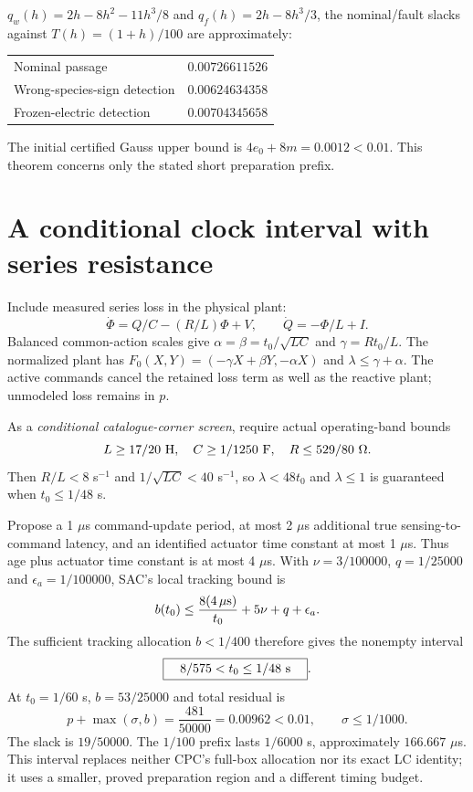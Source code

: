 \documentclass[10pt,a4paper]{article}
\begin{document}
$q_w(h)=2h-8h^2-11h^3/8$ and $q_f(h)=2h-8h^3/3$, the nominal/fault slacks against $T(h)=(1+h)/100$ are approximately:
\begin{center}
\begin{tabular}{lr}\toprule
Nominal passage & $0.00726611526$\\
Wrong-species-sign detection & $0.00624634358$\\
Frozen-electric detection & $0.00704345658$\\\bottomrule
\end{tabular}
\end{center}
The initial certified Gauss upper bound is $4e_0+8m=0.0012<0.01$. This theorem concerns only the stated short preparation prefix.
\newpage
\section{A conditional clock interval with series resistance}
Include measured series loss in the physical plant:
\begin{equation}
\dot\Phi=Q/C-(R/L)\Phi+V,\qquad \dot Q=-\Phi/L+I .
\end{equation}
Balanced common-action scales give $\alpha=\beta=t_0/\sqrt{LC}$ and $\gamma=Rt_0/L$. The normalized plant has
$F_0(X,Y)=(-\gamma X+\beta Y,-\alpha X)$ and
$\lambda\leq\gamma+\alpha$.
The active commands cancel the retained loss term as well as the reactive plant; unmodeled loss remains in $p$.

As a \emph{conditional catalogue-corner screen}, require actual operating-band bounds
\begin{equation}
L\geq17/20\ {\rm H},\quad C\geq1/1250\ {\rm F},\quad
R\leq529/80\ \Omega .
\end{equation}
Then $R/L<8$ s$^{-1}$ and $1/\sqrt{LC}<40$ s$^{-1}$, so $\lambda<48t_0$ and $\lambda\leq1$ is guaranteed when $t_0\leq1/48$ s.

Propose a 1 $\mu$s command-update period, at most 2 $\mu$s additional true sensing-to-command latency, and an identified actuator time constant at most 1 $\mu$s. Thus age plus actuator time constant is at most 4 $\mu$s. With $\nu=3/100000$, $q=1/25000$ and $\epsilon_a=1/100000$, SAC's local tracking bound is
\begin{equation}
b(t_0)\leq \frac{8(4\,\mu{\rm s})}{t_0}
+5\nu+q+\epsilon_a .
\end{equation}
The sufficient tracking allocation $b<1/400$ therefore gives the nonempty interval
\begin{equation}
\boxed{\quad 8/575<t_0\leq1/48\ {\rm s}\quad}.
\end{equation}
At $t_0=1/60$ s, $b=53/25000$ and total residual is
\begin{equation}
p+\max(\sigma,b)=\frac{481}{50000}=0.00962<0.01,
\qquad \sigma\leq1/1000 .
\end{equation}
The slack is $19/50000$. The $1/100$ prefix lasts $1/6000$ s, approximately $166.667$ $\mu$s. This interval replaces neither CPC's full-box allocation nor its exact LC identity; it uses a smaller, proved preparation region and a different timing budget.
\end{document}
